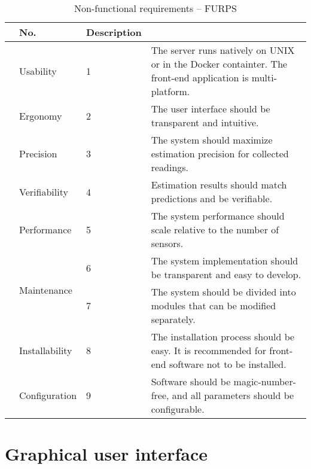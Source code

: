 \renewcommand{\arraystretch}{1.2}
\begin{table}[!h]
	\centering
	\caption{Non-functional requirements -- FURPS}
	\label{furps}
	\begin{tabular}{|m{}|m{}|m{}|m{}|} 
		\hline
		\rowcolor{Gray}		\multicolumn{2}{|c|}{Requirement} & No. & Description \\
		\hline
		\centering \multirow{2.0}{*}{\rotatebox[origin=c]{90}{Usability}}
		&\multirow{1}{*}{Usability} 
		& 1 & The server runs natively on UNIX or in the Docker containter. The front-end application is multi-platform. \\
		\cline{2-4}
		& \multirow{1}{*}{Ergonomy} 
		& 2 & The user interface should be transparent and intuitive.  \\
		\cline{3-4}
		\hline
		\centering \multirow{2.0}{*}{\rotatebox[origin=c]{90}{Reliability}}
		& \multirow{1}{*}{Precision} 
		& 3 & The system should maximize estimation precision for collected readings. \\
		\cline{2-4}
		& \multirow{1}{*}{Verifiability} 
		& 4 & Estimation results should match predictions and be verifiable. \\
		\hline
		\centering \multirow{1}{*}{\rotatebox[origin=c]{90}{Perf.}}
		& \multirow{1}{*}{Performance} 
		& 5 & The system performance should scale relative to the number of sensors. \\
		\hline
		\centering \multirow{5.5}{*}{\rotatebox[origin=c]{90}{Supportability}}
		& \multirow{2}{*}{Maintenance} 
		& 6 & The system implementation should be transparent and easy to develop.  \\
		\cline{3-4}
		& & 7 & The system should be divided into modules that can be modified separately.\\
		\cline{2-4}
		& \multirow{1}{*}{Installability} 
		& 8 & The installation process should be easy. It is recommended for front-end software not to be installed. \\
		\cline{2-4}
		& \multirow{1}{*}{Configuration} 
		& 9 & Software should be magic-number-free, and all parameters should be configurable. \\
		\hline
	\end{tabular}
\end{table}

\section{Graphical user interface}

